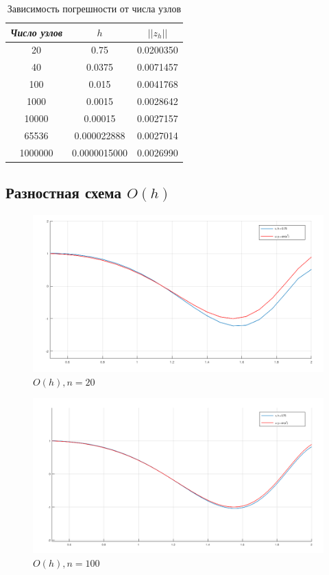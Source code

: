 \documentclass[12pt]{article}
\begin{document}
\begin{table}[H]
\caption{Зависимость погрешности от числа узлов}
\begin{center}
\begin{tabular}{|c|c|c|}
\hline
\textit{Число узлов} &$ h$ & $||z_h||$  \\
\hline
20 & 0.75 & 0.0200350 \\
\hline
40 & 0.0375 & 0.0071457 \\
\hline
100 & 0.015 & 0.0041768 \\
\hline
1000 & 0.0015 & 0.0028642 \\
\hline
10000 & 0.00015 & 0.0027157 \\
\hline
65536 & 0.000022888 & 0.0027014 \\
\hline
1000000 & 0.0000015000 & 0.0026990 \\
\hline
\end{tabular}
\end{center}
\end{table}

\subsection{Разностная схема $O(h)$}

\newpage
\begin{figure}
\begin{center}
\includegraphics[scale = 0.4]{h_20.png} 
\end{center}
\caption{$O(h), n = 20$ }
\end{figure}

\newpage
\begin{figure}
\begin{center}
\includegraphics[scale = 0.4]{h_100.png} 
\end{center}
\caption{$O(h), n = 100$}
\end{figure}
\end{document}
